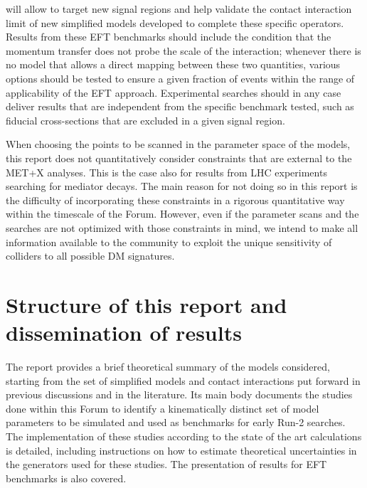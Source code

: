 will allow to target new signal regions and help validate the 
contact interaction limit of new simplified models 
developed to complete these specific operators. 
Results from these EFT benchmarks should include the condition that
the momentum transfer does not probe the scale of the interaction; whenever there is no model
that allows a direct mapping between these two quantities, various options should be tested to 
ensure a given fraction of events within the range of applicability of the EFT approach.
Experimental searches should in any case deliver 
results that are independent from the specific benchmark tested, such as fiducial cross-sections that
are excluded in a given signal region. 

When choosing the points to be scanned in the parameter space of the models,
this report does not quantitatively consider constraints that are 
external to the MET+X analyses. This is the case also for results from LHC experiments
searching for mediator decays. 
The main reason for not doing so in this report 
is the difficulty of incorporating these constraints in a rigorous quantitative way within
the timescale of the Forum. However, even if the parameter scans
and the searches are not optimized with those constraints in mind, 
we intend to make all information available to the community to exploit
the unique sensitivity of colliders to all possible DM signatures. 

\section{Structure of this report and dissemination of results}

The report provides a brief theoretical summary of the models considered, 
starting from the set of simplified models and contact interactions put forward 
in previous discussions and in the literature. 
Its main body documents the studies 
done within this Forum to identify a kinematically distinct set of model parameters
to be simulated and used as benchmarks for early Run-2 searches. The implementation
of these studies according to the state of the art calculations is detailed,
including instructions on how to estimate theoretical uncertainties in the generators used
for these studies. The presentation of results for EFT benchmarks is also covered. 

